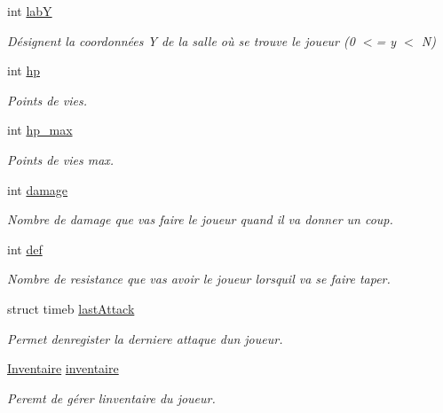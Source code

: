 \begin{DoxyCompactItemize}
int \hyperlink{structPlayer_a4493a9445fdae1062e5fc0485010e3d8}{labY}
\begin{DoxyCompactList}\small\item\em Désignent la coordonnées Y de la salle où se trouve le joueur (0 $<$= y $<$ N) \end{DoxyCompactList}\item 
\mbox{\label{structPlayer_a2baad6b9a274417a7374baf11d5f723d}} 
int \hyperlink{structPlayer_a2baad6b9a274417a7374baf11d5f723d}{hp}
\begin{DoxyCompactList}\small\item\em Points de vies. \end{DoxyCompactList}\item 
\mbox{\label{structPlayer_aef9058c421fbf049050351a4652b5536}} 
int \hyperlink{structPlayer_aef9058c421fbf049050351a4652b5536}{hp\+\_\+max}
\begin{DoxyCompactList}\small\item\em Points de vies max. \end{DoxyCompactList}\item 
\mbox{\label{structPlayer_a433fa478597adbefe4ac3911c5639968}} 
int \hyperlink{structPlayer_a433fa478597adbefe4ac3911c5639968}{damage}
\begin{DoxyCompactList}\small\item\em Nombre de damage que vas faire le joueur quand il va donner un coup. \end{DoxyCompactList}\item 
\mbox{\label{structPlayer_af93595b7910c3ced000fa5962b1900aa}} 
int \hyperlink{structPlayer_af93595b7910c3ced000fa5962b1900aa}{def}
\begin{DoxyCompactList}\small\item\em Nombre de resistance que vas avoir le joueur lorsqu\textquotesingle{}il va se faire taper. \end{DoxyCompactList}\item 
\mbox{\label{structPlayer_a7c285e578e1605091cda222037d3fafc}} 
struct timeb \hyperlink{structPlayer_a7c285e578e1605091cda222037d3fafc}{last\+Attack}
\begin{DoxyCompactList}\small\item\em Permet d\textquotesingle{}enregister la derniere attaque d\textquotesingle{}un joueur. \end{DoxyCompactList}\item 
\mbox{\label{structPlayer_a8c9d732c0aa3b5e1bc3adc8c7086b753}} 
\hyperlink{const_8h_a3eb470313bbbc3a8c713e8f40336e254}{Inventaire} \hyperlink{structPlayer_a8c9d732c0aa3b5e1bc3adc8c7086b753}{inventaire}
\begin{DoxyCompactList}\small\item\em Peremt de gérer l\textquotesingle{}inventaire du joueur. \end{DoxyCompactList}\end{DoxyCompactItemize}
